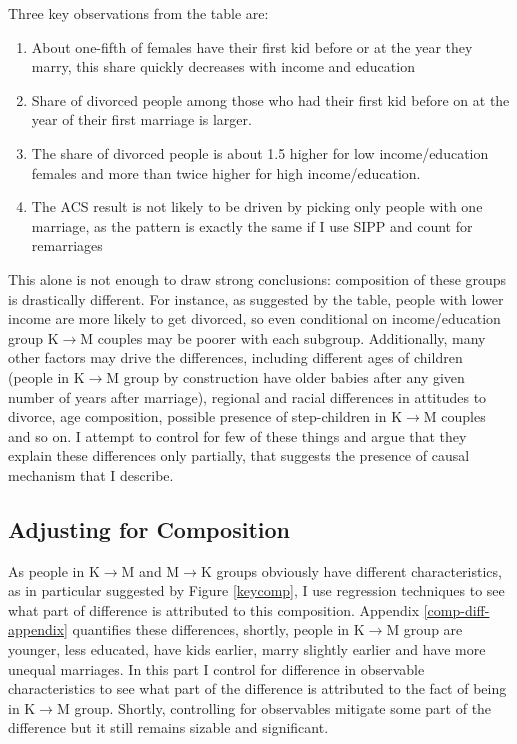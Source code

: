 \documentclass[12pt,letter]{article}
\begin{document}
Three key observations from the table are:
\begin{enumerate}
\item About one-fifth of females have their first kid before or at the year they marry, this share quickly decreases with income and education
\item Share of divorced people among those who had their first kid before on at the year of their first marriage is larger.
\item The share of divorced people is about 1.5 higher for low income/education females and more than twice higher for high income/education.
\item The ACS result is not likely to be driven by picking only people with one marriage, as the pattern is exactly the same if I use SIPP and count for remarriages
\end{enumerate}

This alone is not enough to draw strong conclusions: composition of these groups is drastically different. For instance, as suggested by the table, people with lower income are more likely to get divorced, so even conditional on income/education group K$\to$M couples may be poorer with each subgroup. Additionally, many other factors may drive the differences, including different ages of children (people in K$\to$M group by construction have older babies after any given number of years after marriage), regional and racial differences in attitudes to divorce, age composition, possible presence of step-children in K$\to$M couples and so on. I attempt to control for few of these things and argue that they explain these differences only partially, that suggests the presence of causal mechanism that I describe.

\subsection{Adjusting for Composition}
As people in K$\to$M and M$\to$K groups obviously have different characteristics, as in particular suggested by Figure \ref{keycomp}, I use regression techniques to see what part of difference is attributed to this composition. Appendix \ref{comp-diff-appendix} quantifies these differences, shortly, people in K$\to$M group are younger, less educated, have kids earlier, marry slightly earlier and have more unequal marriages. In this part I control for difference in observable characteristics to see what part of the difference is attributed to the fact of being in K$\to$M group. Shortly, controlling for observables mitigate some part of the difference but it still remains sizable and significant.
\end{document}
